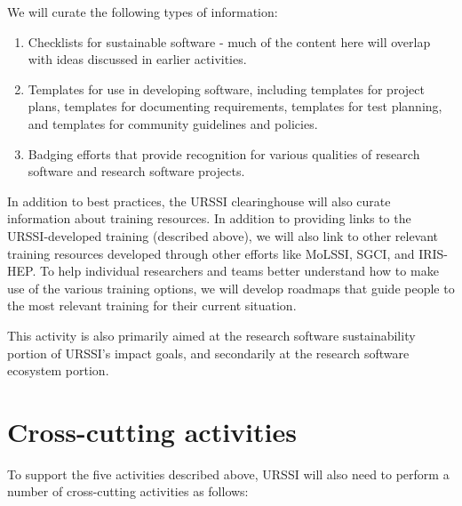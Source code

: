 \documentclass[
]{book}
\begin{document}
We will curate the following types of information:

\begin{enumerate}
\def\labelenumi{\arabic{enumi}.}
\item
  Checklists for sustainable software - much of the content here will overlap with
  ideas discussed in earlier activities.
\item
  Templates for use in developing software, including templates for project plans,
  templates for documenting requirements, templates for test planning, and templates
  for community guidelines and policies.
\item
  Badging efforts that provide recognition for various qualities of research software
  and research software projects.
\end{enumerate}

In addition to best practices, the URSSI clearinghouse will also curate information
about training resources. In addition to providing links to the URSSI-developed training
(described above), we will also link to other relevant training resources developed
through other efforts like MoLSSI, SGCI, and IRIS-HEP. To help individual researchers
and teams better understand how to make use of the various training options, we will
develop roadmaps that guide people to the most relevant training for their current situation.

This activity is also primarily aimed at the research software sustainability portion of URSSI's impact goals, and secondarily at the research software ecosystem portion.

\hypertarget{cross-cutting-activities}{%
\section{Cross-cutting activities}\label{cross-cutting-activities}}

To support the five activities described above, URSSI will also need to perform a number
of cross-cutting activities as follows:
\end{document}
